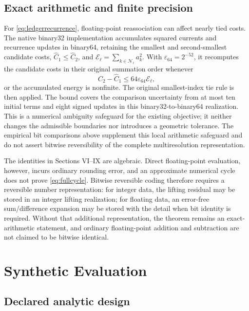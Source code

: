 \documentclass[journal]{IEEEtran}
\begin{document}
\subsection{Exact arithmetic and finite precision}

For \eqref{eq:ledgerrecurrence}, floating-point reassociation can affect
nearly tied costs. The native binary32 implementation accumulates squared
currents and recurrence updates in binary64, retaining the smallest and
second-smallest candidate costs, \(\widehat C_1\leq\widehat C_2\), and
\(\mathcal E_\ell=\sum_{k\in\mathcal N_\ell}a_k^2\). With
\(\varepsilon_{64}=2^{-52}\), it recomputes the candidate costs in their
original summation order whenever
\begin{equation}
 \widehat C_2-\widehat C_1
 \leq64\varepsilon_{64}\mathcal E_\ell,
 \label{eq:ledgertieguard}
\end{equation}
or the accumulated energy is nonfinite. The original smallest-index tie
rule is then applied. The bound covers the comparison uncertainty from
at most ten initial terms and eight signed updates in this binary32-to-binary64
realization. This is a numerical ambiguity safeguard for the existing
objective; it neither changes the admissible boundaries nor introduces a
geometric tolerance. The empirical bit comparisons above supplement this
local arithmetic safeguard and do not assert bitwise reversibility of the
complete multiresolution representation.


The identities in Sections VI--IX are algebraic. Direct floating-point
evaluation, however, incurs ordinary rounding error, and an approximate
numerical cycle does not prove \eqref{eq:fullcycle}. Bitwise reversible coding
therefore requires a reversible number representation: for integer data, the
lifting residual may be stored in an integer lifting realization; for
floating data, an error-free sum/difference expansion may be stored with the
detail when bit identity is required. Without that additional representation,
the theorem remains an exact-arithmetic statement, and ordinary
floating-point addition and subtraction are not claimed to be bitwise
identical.

\raggedbottom
\section{Synthetic Evaluation}

\subsection{Declared analytic design}
\end{document}

